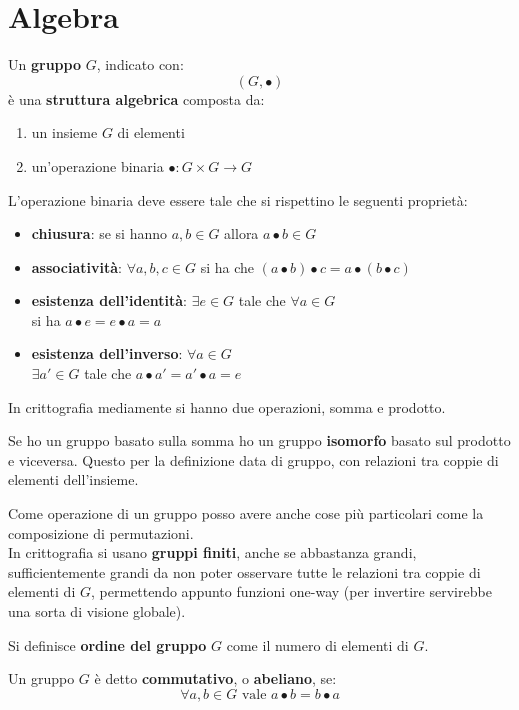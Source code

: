 \documentclass[a4paper,12pt, oneside]{book}
\begin{document}
\section{Algebra}
\begin{definizione}
  Un \textbf{gruppo} $G$, indicato con:
  \[(G,\bullet)\]
  è una \textbf{struttura algebrica} composta da:
  \begin{enumerate}
    \item un insieme $G$ di elementi
    \item un'operazione binaria $\bullet:G\times G\to G$
  \end{enumerate}
  L'operazione binaria deve essere tale che si rispettino le seguenti
  proprietà: 
  \begin{itemize}
    \item \textbf{chiusura}: se si hanno $a,b\in G$ allora $a\bullet b\in G$
    \item \textbf{associatività}: $\forall a,b,c\in G$ si ha che $(a\bullet
    b) \bullet c= a\bullet (b\bullet c)$
    \item \textbf{esistenza dell'identità}: $\exists e\in G$ tale che
    $\forall a \in G$ \\si ha $a\bullet e = e \bullet a = a $
    \item \textbf{esistenza dell'inverso}: $\forall a\in G$\\ $\exists a'\in
    G$ tale che $a\bullet a'=a'\bullet a=e$
  \end{itemize}
\end{definizione}
In crittografia mediamente si hanno due operazioni, somma e prodotto.
\begin{teorema}
  Se ho un gruppo basato sulla somma ho un gruppo \textbf{isomorfo} basato sul
  prodotto e viceversa. Questo per la definizione data di gruppo, con
  relazioni tra coppie di elementi dell'insieme.
\end{teorema}
Come operazione di un gruppo posso avere anche cose più particolari come la
composizione di permutazioni.\\
In crittografia si usano \textbf{gruppi finiti}, anche se abbastanza grandi,
sufficientemente grandi da non poter osservare tutte le relazioni tra coppie
di elementi di $G$, permettendo appunto funzioni one-way (per invertire
servirebbe una sorta di visione globale).
\begin{definizione}
  Si definisce \textbf{ordine del gruppo} $G$ come il numero di elementi di
  $G$. 
\end{definizione}
\begin{definizione}
  Un gruppo $G$ è detto \textbf{commutativo}, o \textbf{abeliano}, se:
  \[\forall a,b\in G \mbox{ vale }a\bullet b= b\bullet a\]
\end{definizione}
\end{document}
